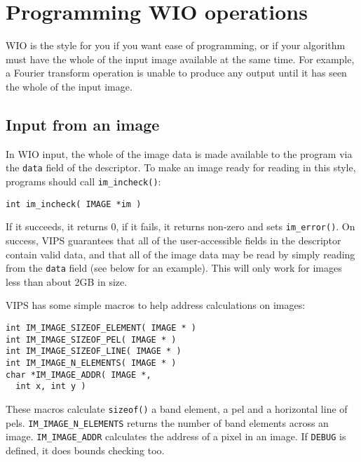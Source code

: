\section{Programming WIO operations}

WIO is the style for you if you want ease of programming, or if your
algorithm must have the whole of the input image available at the same
time. For example, a Fourier transform operation is unable to produce any
output until it has seen the whole of the input image. 

\subsection{Input from an image}

In WIO input, the whole of the image data is made available to the program
via the \verb+data+ field of the descriptor. To make an image ready for reading
in this style, programs should call \verb+im_incheck()+:

\begin{verbatim}
int im_incheck( IMAGE *im ) 
\end{verbatim}

\noindent
If it succeeds, it returns 0, if it fails, it returns non-zero and
sets \verb+im_error()+.  On success, VIPS guarantees that all of the
user-accessible fields in the descriptor contain valid data, and that all
of the image data may be read by simply reading from the \verb+data+ field
(see below for an example). This will only work for images less than about
2GB in size.

VIPS has some simple macros to help address calculations on images:

\begin{verbatim}
int IM_IMAGE_SIZEOF_ELEMENT( IMAGE * )
int IM_IMAGE_SIZEOF_PEL( IMAGE * )
int IM_IMAGE_SIZEOF_LINE( IMAGE * )
int IM_IMAGE_N_ELEMENTS( IMAGE * )
char *IM_IMAGE_ADDR( IMAGE *, 
  int x, int y )
\end{verbatim}

\noindent
These macros calculate \verb+sizeof()+ a band element, a pel and a horizontal
line of pels. \verb+IM_IMAGE_N_ELEMENTS+ returns the number of band elements
across an image. \verb+IM_IMAGE_ADDR+ calculates the address of a pixel in an
image. If \verb+DEBUG+ is defined, it does bounds checking too.

